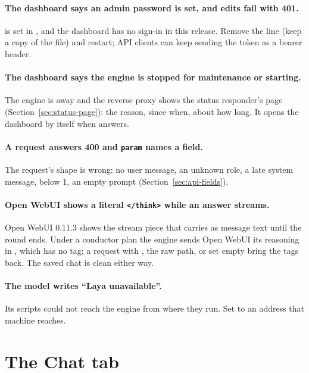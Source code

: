 \paragraph{The dashboard says an admin password is set, and edits fail with 401.}  is set in , and the dashboard has no sign-in in this release. Remove the line (keep a copy of the file) and restart; API clients can keep sending the token as a bearer header.

\paragraph{The dashboard says the engine is stopped for maintenance or starting.} The engine is away and the reverse proxy shows the status responder's page (Section~\ref{sec:status-page}): the reason, since when, about how long. It opens the dashboard by itself when  answers.

\paragraph{A request answers 400 and \texttt{param} names a field.} The request's shape is wrong: no user message, an unknown role, a late system message,  below 1, an empty prompt (Section~\ref{sec:api-fields}).

\paragraph{Open WebUI shows a literal \texttt{</think>} while an answer streams.} Open WebUI 0.11.3 shows the stream piece that carries  as message text until the round ends. Under a conductor plan the engine sends Open WebUI its reasoning in , which has no tag; a request with , the raw path, or  set empty bring the tags back. The saved chat is clean either way.

\paragraph{The model writes ``Laya unavailable''.} Its scripts could not reach the engine from where they run. Set  to an address that machine reaches.

\section{The Chat tab}\label{sec:trouble-chat}

